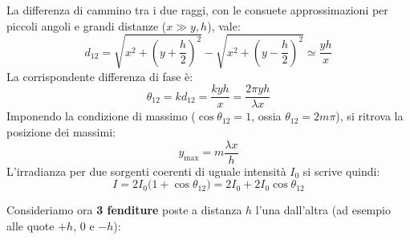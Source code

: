\documentclass[openany,a4paper,12pt]{book}
\begin{document}
La differenza di cammino tra i due raggi, con le consuete approssimazioni per piccoli angoli e grandi distanze ($x \gg y, h$), vale:
\[
    d_{12} = \sqrt{x^2 + \left(y + \frac{h}{2}\right)^2} - \sqrt{x^2 + \left(y - \frac{h}{2}\right)^2} \simeq \frac{y h}{x}
\]
La corrispondente differenza di fase è:
\[
    \theta_{12} = k d_{12} = \frac{k y h}{x} = \frac{2\pi y h}{\lambda x}
\]
Imponendo la condizione di massimo ($\cos\theta_{12} = 1$, ossia $\theta_{12} = 2m\pi$), si ritrova la posizione dei massimi:
\[
    y_{\max} = m \frac{\lambda x}{h}
\]
L'irradianza per due sorgenti coerenti di uguale intensità $I_0$ si scrive quindi:
\[
    I = 2 I_0 \bigl(1 + \cos\theta_{12}\bigr) = 2 I_0 + 2 I_0 \cos\theta_{12}
\]

Consideriamo ora \textbf{3 fenditure} poste a distanza $h$ l'una dall'altra (ad esempio alle quote $+h$, $0$ e $-h$):
\end{document}
